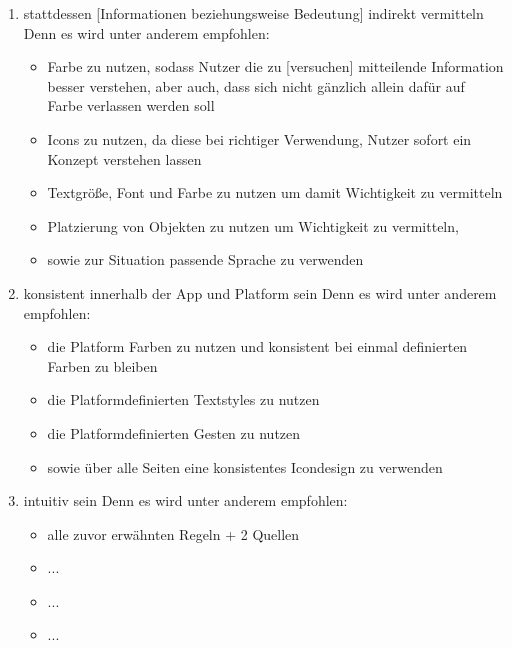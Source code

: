 \begin{enumerate}
	\item stattdessen [Informationen beziehungsweise Bedeutung] indirekt vermitteln\newline%
		Denn es wird unter anderem empfohlen:%
	\begin{itemize}%
		\item Farbe zu nutzen, sodass Nutzer die zu [versuchen] mitteilende 	Information besser verstehen, aber auch, dass sich nicht gänzlich allein dafür auf Farbe verlassen werden soll\cite{konventionen_foundations_color}
		\item Icons zu nutzen, da diese bei richtiger Verwendung, Nutzer sofort ein Konzept  verstehen lassen\cite{konventionen_foundations_icons} 
		\item Textgröße, Font und Farbe zu nutzen um damit Wichtigkeit zu vermitteln\cite{konventionen_foundations_typography}
		\item Platzierung von Objekten zu nutzen um Wichtigkeit zu vermitteln,
		\item sowie zur Situation passende Sprache zu verwenden\cite{konventionen_foundations_writing}
	\end{itemize}
	
	\item konsistent innerhalb der App und Platform sein\newline%
		Denn es wird unter anderem empfohlen:%
	\begin{itemize}%
		\item die Platform Farben zu nutzen und konsistent bei einmal definierten Farben zu bleiben\cite{konventionen_foundations_color}
		\item die Platformdefinierten Textstyles zu nutzen\cite{konventionen_foundations_typography}
		\item die Platformdefinierten Gesten zu nutzen\cite{konventionen_foundations_accessibility} 
		\item sowie über alle Seiten eine konsistentes Icondesign zu verwenden\cite{konventionen_foundations_icons}
	\end{itemize}
	
	
	\item intuitiv sein\newline%
		Denn es wird unter anderem empfohlen:%
	\begin{itemize}%
		\item alle zuvor erwähnten Regeln + 2 Quellen
		\item ...
		\item ...
		\item ...
	\end{itemize}

\end{enumerate}


